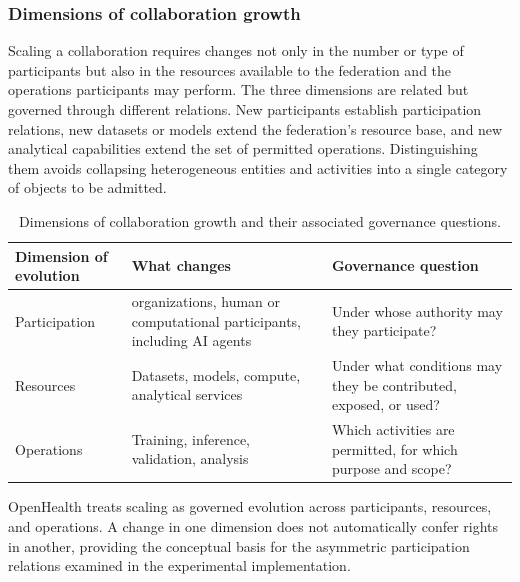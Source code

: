 \documentclass[twoside,11pt]{article}
\begin{document}
\subsubsection{Dimensions of collaboration growth}
Scaling a collaboration requires changes not only in the number or type of participants but also in the resources available to the federation and the operations participants may perform. The three dimensions are related but governed through different relations. New participants establish participation relations, new datasets or models extend the federation's resource base, and new analytical capabilities extend the set of permitted operations. Distinguishing them avoids collapsing heterogeneous entities and activities into a single category of objects to be admitted.

\begin{table}[htbp]
\centering
\caption{Dimensions of collaboration growth and their associated governance questions.}
\label{tab:collaboration-growth}

\begin{tabularx}{\textwidth}{
    >{\raggedright\arraybackslash}p{3.0cm}
    >{\raggedright\arraybackslash}p{5.0cm}
    >{\raggedright\arraybackslash}X
}
\toprule
\textbf{Dimension of evolution} &
\textbf{What changes} &
\textbf{Governance question} \\
\midrule

Participation
&
organizations, human or computational participants, including AI agents
&
Under whose authority may they participate?
\\

\addlinespace

Resources
&
Datasets, models, compute, analytical services
&
Under what conditions may they be contributed, exposed, or used?
\\

\addlinespace

Operations
&
Training, inference, validation, analysis
&
Which activities are permitted, for which purpose and scope?
\\

\bottomrule
\end{tabularx}

\end{table}

OpenHealth  treats scaling as governed evolution across participants, resources, and operations. A change in one dimension does not automatically confer rights in another, providing the conceptual basis for the asymmetric participation relations examined in the experimental implementation.
\end{document}
